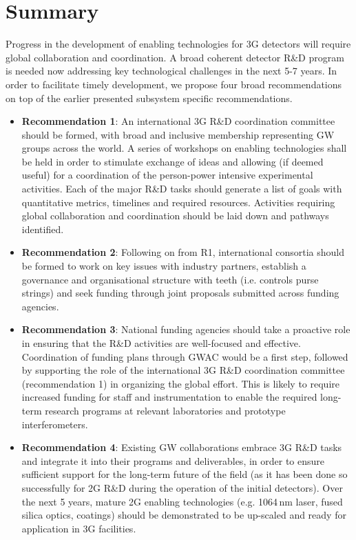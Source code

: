 \chapter{Summary}
\label{sec:Summary}
\vspace{1cm}
Progress in the development of enabling technologies for 3G detectors will require global collaboration and coordination. A broad coherent detector R\&D program is needed now addressing key technological challenges in the next 5-7 years. In order to facilitate timely development, we propose four broad recommendations on top of the earlier presented subsystem specific recommendations.

\begin{itemize}
\item \textbf{Recommendation 1}:  An international 3G R\&D coordination committee should be formed, with broad and inclusive membership representing GW groups across the world. A series of workshops on enabling technologies shall be held in order to stimulate exchange of ideas and allowing (if deemed useful) for a coordination of the person-power intensive experimental activities.  Each of the major R\&D tasks should generate a list of  goals with quantitative metrics,  timelines and required resources.   Activities requiring global collaboration and coordination should be laid down and pathways identified.
\item \textbf{Recommendation 2}:  Following on from R1, international consortia should be formed to work on key issues with industry partners, establish a governance and organisational structure with teeth (i.e. controls purse strings) and seek funding through joint proposals submitted across funding agencies. 
\item \textbf{Recommendation 3}: National funding agencies should take a proactive role in ensuring that the R\&D activities are well-focused and effective.  Coordination of funding plans through GWAC would be a first step, followed by supporting the role of the international 3G R\&D coordination committee (recommendation 1) in organizing the global effort.  This is likely to require increased funding for staff and instrumentation to enable the required long-term research programs at relevant laboratories and prototype interferometers.
\item \textbf{Recommendation 4}: Existing GW collaborations embrace 3G R\&D tasks and integrate it into their programs and deliverables, in order to ensure sufficient support for the long-term future of the field (as it has been done so successfully for 2G R\&D during the operation of the initial detectors). Over the next 5 years, mature 2G enabling technologies (e.g. 1064\,nm laser, fused silica optics, coatings) should be demonstrated to be up-scaled and ready for application in 3G facilities.
\end{itemize}
